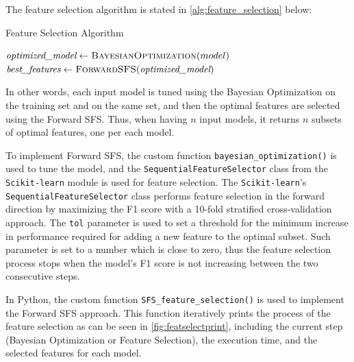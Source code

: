         
        The feature selection algorithm is stated in \autoref{alg:feature_selection} below:
        

        \begin{algorithm}
            \caption{Feature Selection Algorithm}
            \label{alg:feature_selection}
            \begin{algorithmic}[1]
                \State $\textit{optimized\_model} \gets \textsc{BayesianOptimization}(model)$
                \State $\textit{best\_features} \gets \textsc{ForwardSFS}(\textit{optimized\_model})$
            \EndFor
            \end{algorithmic}
        \end{algorithm}

        In other words, each input model is tuned using the Bayesian Optimization on the training set and on the same set, and then the optimal features are selected using the Forward SFS.
        Thus, when having $n$ input models, it returns $n$  subsets of optimal features, one per each model.
        
        To implement Forward SFS, the custom function \lstinline{bayesian_optimization()} is used to tune the model, and the \lstinline{SequentialFeatureSelector} class from the \lstinline{Scikit-learn} module is used for feature selection.
        The \lstinline{Scikit-learn}'s \lstinline{SequentialFeatureSelector} class performs feature selection in the forward direction by maximizing the F1 score with a 10-fold stratified cross-validation approach.
        The \lstinline{tol} parameter is used to set a threshold for the minimum increase in performance required for adding a new feature to the optimal subset.
        Such parameter is set to a number which is close to zero, thus the feature selection process stops when the model's F1 score is not increasing between the two consecutive steps.
        
        In Python, the custom function \lstinline{SFS_feature_selection()} is used to implement the Forward SFS approach.
        This function iteratively prints the process of the feature selection as can be seen in \autoref{fig:featselectprint}, including the current step (Bayesian Optimization or Feature Selection), the execution time, and the selected features for each model.
        
